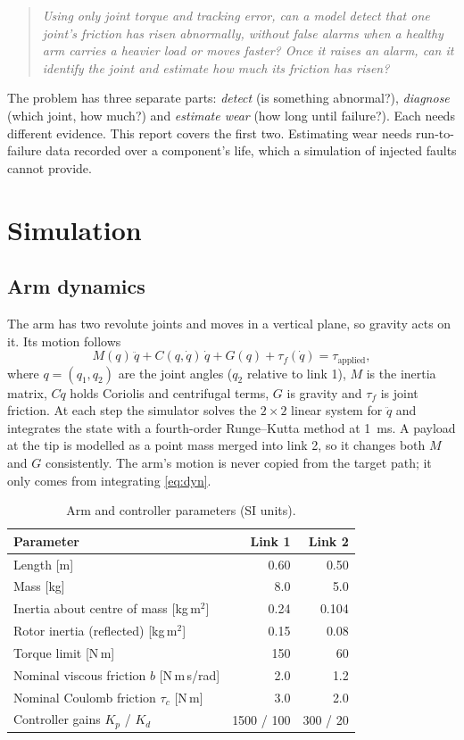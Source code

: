 \documentclass[11pt,a4paper]{article}
\begin{document}
\begin{quote}
\emph{Using only joint torque and tracking error, can a model detect that one joint's friction has risen abnormally,
without false alarms when a healthy arm carries a heavier load or moves faster? Once it raises an alarm, can it
identify the joint and estimate how much its friction has risen?}
\end{quote}

\noindent
The problem has three separate parts: \emph{detect} (is something abnormal?), \emph{diagnose} (which joint, how
much?) and \emph{estimate wear} (how long until failure?). Each needs different evidence. This report covers the
first two. Estimating wear needs run-to-failure data recorded over a component's life, which a simulation of
injected faults cannot provide.

\section{Simulation}
\subsection{Arm dynamics}
The arm has two revolute joints and moves in a vertical plane, so gravity acts on it. Its motion follows
\begin{equation}
  M(q)\,\ddot q + C(q,\dot q)\,\dot q + G(q) + \tau_f(\dot q) = \tau_{\text{applied}},
  \label{eq:dyn}
\end{equation}
where $q=(q_1,q_2)$ are the joint angles ($q_2$ relative to link 1), $M$ is the inertia matrix, $C\dot q$ holds
Coriolis and centrifugal terms, $G$ is gravity and $\tau_f$ is joint friction. At each step the simulator solves the
$2\times2$ linear system for $\ddot q$ and integrates the state with a fourth-order Runge--Kutta method at
\SI{1}{ms}. A payload at the tip is modelled as a point mass merged into link 2, so it changes both $M$ and $G$
consistently. The arm's motion is never copied from the target path; it only comes from integrating
\eqref{eq:dyn}.

\begin{table}[h]
\centering
\caption{Arm and controller parameters (SI units).}
\begin{tabular}{lrr}
\toprule
Parameter & Link 1 & Link 2 \\
\midrule
Length [m] & 0.60 & 0.50 \\
Mass [kg] & 8.0 & 5.0 \\
Inertia about centre of mass [kg\,m$^2$] & 0.24 & 0.104 \\
Rotor inertia (reflected) [kg\,m$^2$] & 0.15 & 0.08 \\
Torque limit [N\,m] & 150 & 60 \\
Nominal viscous friction $b$ [N\,m\,s/rad] & 2.0 & 1.2 \\
Nominal Coulomb friction $\tau_c$ [N\,m] & 3.0 & 2.0 \\
Controller gains $K_p$ / $K_d$ & 1500 / 100 & 300 / 20 \\
\bottomrule
\end{tabular}
\end{table}
\end{document}
